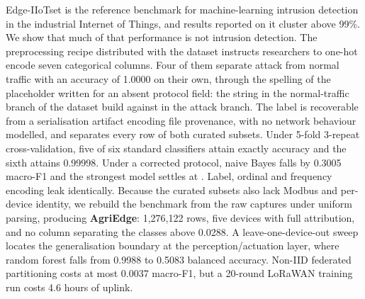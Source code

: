 Edge-IIoTset is the reference benchmark for machine-learning intrusion
detection in the industrial Internet of Things, and results reported on it
cluster above 99\%. We show that much of that performance is not intrusion
detection. The preprocessing recipe distributed with the dataset instructs
researchers to one-hot encode seven categorical columns. Four of them separate
attack from normal traffic with an accuracy of 1.0000 on their own, through the
spelling of the placeholder written for an absent protocol field: the string
 in the normal-traffic branch of the dataset build against 
in the attack branch. The label is recoverable from a serialisation artifact
encoding file provenance, with no network behaviour modelled, and separates
every row of both curated subsets. Under 5-fold \by{} 3-repeat
cross-validation, five of six standard classifiers attain exactly  accuracy and the sixth attains 0.99998. Under a corrected protocol,
naive Bayes falls by 0.3005 macro-F1 and the strongest model settles at
. Label, ordinal and frequency encoding leak identically.
Because the curated subsets also lack Modbus and per-device identity, we
rebuild the benchmark from the raw captures under uniform parsing, producing
\textbf{AgriEdge}: 1{,}276{,}122 rows, five devices with full attribution, and
no column separating the classes above 0.0288. A leave-one-device-out sweep
locates the generalisation boundary at the perception/actuation layer, where
random forest falls from 0.9988 to 0.5083 balanced accuracy. Non-IID federated
partitioning costs at most 0.0037 macro-F1, but a 20-round LoRaWAN training run
costs 4.6 hours of uplink.
